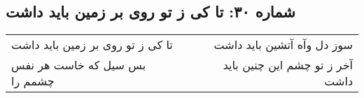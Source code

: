 \begin{center}
\section*{شماره ۳۰: تا کی ز تو روی بر زمین باید داشت}
\label{sec:030}
\begin{longtable}{l p{0.5cm} r}
تا کی ز تو روی بر زمین باید داشت
&&
سوز دل وآه آتشین باید داشت
\\
بس سیل که خاست هر نفس چشمم را
&&
آخر ز تو چشم این چنین باید داشت
\\
\end{longtable}
\end{center}
